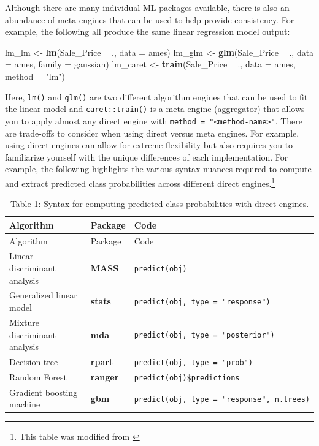 \documentclass[]{krantz}
\makeatletter
\newenvironment{Shaded}{\begin{snugshade}}{\end{snugshade}}
\newcommand{\DataTypeTok}[1]{\textcolor[rgb]{0.27,0.27,0.27}{#1}}
\newcommand{\KeywordTok}[1]{\textcolor[rgb]{0.27,0.27,0.27}{\textbf{#1}}}
\newcommand{\NormalTok}[1]{#1}
\newcommand{\OperatorTok}[1]{\textcolor[rgb]{0.43,0.43,0.43}{\textbf{#1}}}
\newcommand{\StringTok}[1]{\textcolor[rgb]{0.5,0.5,0.5}{#1}}
\newenvironment{kframe}{%
\medskip{}
\setlength{\fboxsep}{.8em}
 \def\at@end@of@kframe{}%
 \ifinner\ifhmode%
  \def\at@end@of@kframe{\end{minipage}}%
  \begin{minipage}{\columnwidth}%
 \fi\fi%
 \def\FrameCommand##1{\hskip\@totalleftmargin \hskip-\fboxsep
 \colorbox{shadecolor}{##1}\hskip-\fboxsep
     \hskip-\linewidth \hskip-\@totalleftmargin \hskip\columnwidth}%
 \MakeFramed {\advance\hsize-\width
   \@totalleftmargin\z@ \linewidth\hsize
   \@setminipage}}%
 {\par\unskip\endMakeFramed%
 \at@end@of@kframe}
\renewenvironment{Shaded}{\begin{kframe}}{\end{kframe}}
\makeatother
\begin{document}
Although there are many individual ML packages available, there is also an abundance of meta engines that can be used to help provide consistency. For example, the following all produce the same linear regression model output:

\begin{Shaded}
\begin{Highlighting}[]
\NormalTok{lm_lm    <-}\StringTok{ }\KeywordTok{lm}\NormalTok{(Sale_Price }\OperatorTok{~}\StringTok{ }\NormalTok{., }\DataTypeTok{data =}\NormalTok{ ames)}
\NormalTok{lm_glm   <-}\StringTok{ }\KeywordTok{glm}\NormalTok{(Sale_Price }\OperatorTok{~}\StringTok{ }\NormalTok{., }\DataTypeTok{data =}\NormalTok{ ames, }\DataTypeTok{family =}\NormalTok{ gaussian)}
\NormalTok{lm_caret <-}\StringTok{ }\KeywordTok{train}\NormalTok{(Sale_Price }\OperatorTok{~}\StringTok{ }\NormalTok{., }\DataTypeTok{data =}\NormalTok{ ames, }\DataTypeTok{method =} \StringTok{"lm"}\NormalTok{)}
\end{Highlighting}
\end{Shaded}

Here, \texttt{lm()} and \texttt{glm()} are two different algorithm engines that can be used to fit the linear model and \texttt{caret::train()} is a meta engine (aggregator) that allows you to apply almost any direct engine with \texttt{method\ =\ "\textless{}method-name\textgreater{}"}. There are trade-offs to consider when using direct versus meta engines. For example, using direct engines can allow for extreme flexibility but also requires you to familiarize yourself with the unique differences of each implementation. For example, the following highlights the various syntax nuances required to compute and extract predicted class probabilities across different direct engines.\footnote{This table was modified from \citet{kuhnMLtraining2019}}

\begin{longtable}[]{@{}lll@{}}
\caption{Table 1: Syntax for computing predicted class probabilities with direct engines.}\tabularnewline
\toprule
Algorithm & Package & Code\tabularnewline
\midrule
\endfirsthead
\toprule
Algorithm & Package & Code\tabularnewline
\midrule
\endhead
Linear discriminant analysis & \textbf{MASS} & \texttt{predict(obj)}\tabularnewline
Generalized linear model & \textbf{stats} & \texttt{predict(obj,\ type\ =\ "response")}\tabularnewline
Mixture discriminant analysis & \textbf{mda} & \texttt{predict(obj,\ type\ =\ "posterior")}\tabularnewline
Decision tree & \textbf{rpart} & \texttt{predict(obj,\ type\ =\ "prob")}\tabularnewline
Random Forest & \textbf{ranger} & \texttt{predict(obj)\$predictions}\tabularnewline
Gradient boosting machine & \textbf{gbm} & \texttt{predict(obj,\ type\ =\ "response",\ n.trees)}\tabularnewline
\bottomrule
\end{longtable}
\end{document}
